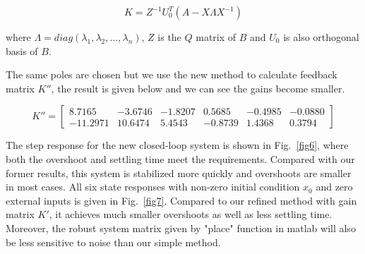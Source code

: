 \documentclass[hyperref]{article}
\theoremstyle{nonumberplain}
\begin{document}
	\begin{equation}
	K=Z^{-1}U_{0}^{T}(A-X\Lambda X^{-1})
	\label{eq18}
	\end{equation}
	
	where $\Lambda=diag(\lambda_{1},\lambda_{2},...,\lambda_{n})$, $Z$ is the $Q$ matrix of $B$ and $U_{0}$ is also orthogonal basis of $B$.
	
	The same poles are chosen but we use the new method to calculate feedback matrix ${K}''$, the result is given below and we can see the gains become smaller.
	
	\begin{equation}
	{K}''=\begin{bmatrix}
	8.7165 &-3.6746  &-1.8207  &0.5685  &-0.4985  &-0.0880 \\ 
	-11.2971 &10.6474  &5.4543  &-0.8739  &1.4368  &0.3794 
	\end{bmatrix}
	\nonumber
	\end{equation}
	
	The step response for the new closed-loop system is shown in Fig.~\ref{fig6}, where both the overshoot and settling time meet the requirements. Compared with our former results, this system is stabilized more quickly and overshoots are smaller in most cases. All six state responses with non-zero initial condition $x_{0}$ and zero external inputs is given in Fig.~\ref{fig7}. Compared to our refined method with gain matrix ${K}'$, it achieves much smaller overshoots as well as less settling time. Moreover, the robust system matrix given by "place" function in matlab will also be less sensitive to noise than our simple method. 
	
\end{document}
